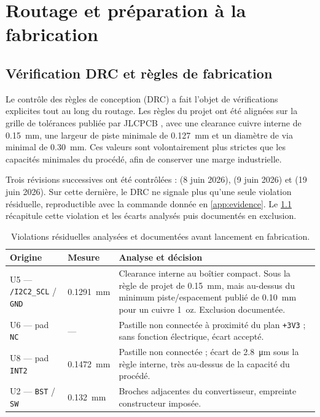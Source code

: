 \chapter{Routage et préparation à la fabrication}
\label{chap:fabrication}

\section{Vérification DRC et règles de fabrication}
\label{sec:drc}

Le contrôle des règles de conception (DRC) a fait l'objet de vérifications explicites tout au long du routage. Les règles du projet ont été alignées sur la grille de tolérances publiée par JLCPCB \cite{jlcpcb-capabilities}, avec une clearance cuivre interne de \SI{0.15}{\milli\metre}, une largeur de piste minimale de \SI{0.127}{\milli\metre} et un diamètre de via minimal de \SI{0.30}{\milli\metre}. Ces valeurs sont volontairement plus strictes que les capacités minimales du procédé, afin de conserver une marge industrielle.

Trois révisions successives ont été contrôlées :  (8 juin 2026),  (9 juin 2026) et  (19 juin 2026). Sur cette dernière, le DRC ne signale plus qu'une seule violation résiduelle, reproductible avec la commande donnée en \cref{app:evidence}. Le \cref{tab:drc-final} récapitule cette violation et les écarts analysés puis documentés en exclusion.

\begin{table}[H]
  \centering
  \small
  \caption{Violations résiduelles analysées et documentées avant lancement en fabrication.}
  \label{tab:drc-final}
  \begin{tabularx}{\textwidth}{@{}l l X@{}}
    \toprule
    \textbf{Origine} & \textbf{Mesure} & \textbf{Analyse et décision} \\
    \midrule
    U5 --- \texttt{/I2C2\_SCL} / \texttt{GND} & \SI{0.1291}{\milli\metre} & Clearance interne au boîtier compact. Sous la règle de projet de \SI{0.15}{\milli\metre}, mais au-dessus du minimum piste/espacement publié de \SI{0.10}{\milli\metre} pour un cuivre \SI{1}{oz}. Exclusion documentée. \\
    U6 --- pad \texttt{NC} & --- & Pastille non connectée à proximité du plan \texttt{+3V3} ; sans fonction électrique, écart accepté. \\
    U8 --- pad \texttt{INT2} & \SI{0.1472}{\milli\metre} & Pastille non connectée ; écart de \SI{2.8}{\micro\metre} sous la règle interne, très au-dessus de la capacité du procédé. \\
    U2 --- \texttt{BST} / \texttt{SW} & \SI{0.132}{\milli\metre} & Broches adjacentes du convertisseur, empreinte constructeur imposée. \\
    \bottomrule
  \end{tabularx}
\end{table}

